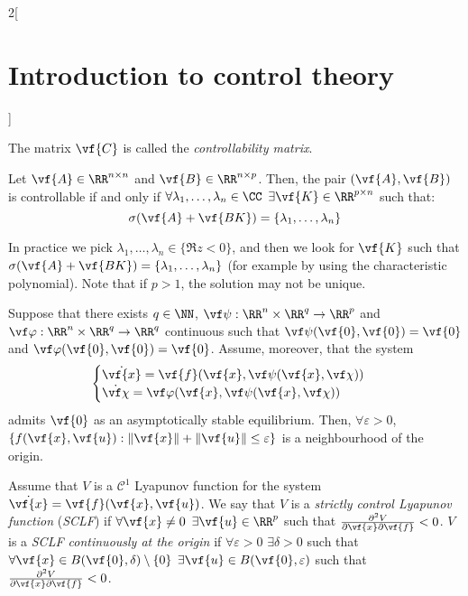 \documentclass[../../../main_math.tex]{subfiles}
\begin{document}
\begin{multicols}{2}[\section{Introduction to control theory}]
\begin{theorem}
$$    $$
    The matrix $\vf{C}$ is called the \emph{controllability matrix}.
  \end{theorem}
  \begin{theorem}
    Let $\vf{A} \in \RR^{n\times n}$ and $\vf{B}\in \RR^{n\times p}$. Then, the pair $(\vf{A}, \vf{B})$ is controllable if and only if $\forall \lambda_1,\ldots,\lambda_n\in \CC$ $\exists \vf{K}\in \RR^{p\times n}$ such that: $$\sigma(\vf{A}+\vf{BK})=\{\lambda_1,\ldots,\lambda_n\}$$
  \end{theorem}
  \begin{remark}
    In practice we pick $\lambda_1,\ldots,\lambda_n\in \{\Re z<0\}$, and then we look for $\vf{K}$ such that $\sigma(\vf{A}+\vf{BK})= \{\lambda_1,\ldots,\lambda_n\}$ (for example by using the characteristic polynomial). Note that if $p>1$, the solution may not be unique.
  \end{remark}
  \begin{theorem}
    Suppose that there exists $q\in \NN$, $\vf\psi:\RR^n\times \RR^q \to \RR^p$ and $\vf\varphi:\RR^n\times \RR^q \to \RR^q$ continuous such that $\vf\psi(\vf{0}, \vf{0}) = \vf{0}$ and $\vf\varphi(\vf{0}, \vf{0}) = \vf{0}$. Assume, moreover, that the system
    \begin{equation*}
      \begin{cases}
        \dot{\vf{x}} = \vf{f}(\vf{x}, \vf\psi(\vf{x}, \vf\chi)) \\
        \dot{\vf\chi} = \vf\varphi(\vf{x}, \vf\psi(\vf{x}, \vf\chi))
      \end{cases}
    \end{equation*}
    admits $\vf{0}$ as an asymptotically stable equilibrium. Then, $\forall \varepsilon>0$, $\{f(\vf{x}, \vf{u}): \norm{\vf{x}}+\norm{\vf{u}}\leq \varepsilon\}$ is a neighbourhood of the origin.
  \end{theorem}
  \begin{definition}
    Assume that $V$ is a $\mathcal{C}^1$ Lyapunov function for the system $\dot{\vf{x}} = \vf{f}(\vf{x}, \vf{u})$. We say that $V$ is a \emph{strictly control Lyapunov function} (\emph{SCLF}) if $\forall\vf{x}\ne 0$ $\exists \vf{u}\in \RR^p$ such that $\pdv{V}{\vf{x}}\vf{f}(\vf{x}, \vf{u})<0$. $V$ is a \emph{SCLF continuously at the origin} if $\forall\varepsilon>0$ $\exists \delta>0$ such that $\forall \vf{x}\in B(\vf{0},\delta)\setminus\{0\}$ $\exists \vf{u}\in B(\vf{0},\varepsilon)$ such that $\pdv{V}{\vf{x}}\vf{f}(\vf{x}, \vf{u})<0$.
  \end{definition}
  \begin{theorem}

\end{theorem}
\end{multicols}
\end{document}

